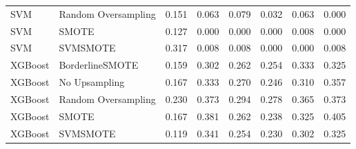 \begin{tabular}{llllllll}
                         SVM & Random Oversampling & 0.151 &                     0.063 &                 0.079 &                  0.032 &                                   0.063 &     0.000 \\
                         SVM &               SMOTE & 0.127 &                     0.000 &                 0.000 &                  0.000 &                                   0.008 &     0.000 \\
                         SVM &            SVMSMOTE & 0.317 &                     0.008 &                 0.008 &                  0.000 &                                   0.000 &     0.008 \\
                     XGBoost &     BorderlineSMOTE & 0.159 &                     0.302 &                 0.262 &                  0.254 &                                   0.333 &     0.325 \\
                     XGBoost &       No Upsampling & 0.167 &                     0.333 &                 0.270 &                  0.246 &                                   0.310 &     0.357 \\
                     XGBoost & Random Oversampling & 0.230 &                     0.373 &                 0.294 &                  0.278 &                                   0.365 &     0.373 \\
                     XGBoost &               SMOTE & 0.167 &                     0.381 &                 0.262 &                  0.238 &                                   0.325 &     0.405 \\
                     XGBoost &            SVMSMOTE & 0.119 &                     0.341 &                 0.254 &                  0.230 &                                   0.302 &     0.325 \\
\bottomrule
\end{tabular}
